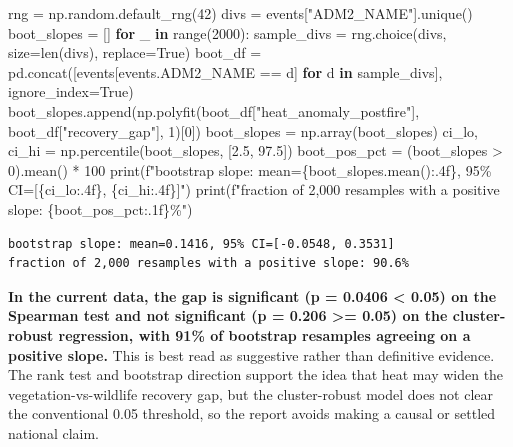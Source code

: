 \documentclass[
  letterpaper,
  DIV=11,
  numbers=noendperiod]{scrartcl}
\newenvironment{Shaded}{\begin{snugshade}}{\end{snugshade}}
\newcommand{\BuiltInTok}[1]{\textcolor[rgb]{0.00,0.23,0.31}{#1}}
\newcommand{\ControlFlowTok}[1]{\textcolor[rgb]{0.00,0.23,0.31}{\textbf{#1}}}
\newcommand{\DecValTok}[1]{\textcolor[rgb]{0.68,0.00,0.00}{#1}}
\newcommand{\FloatTok}[1]{\textcolor[rgb]{0.68,0.00,0.00}{#1}}
\newcommand{\KeywordTok}[1]{\textcolor[rgb]{0.00,0.23,0.31}{\textbf{#1}}}
\newcommand{\NormalTok}[1]{\textcolor[rgb]{0.00,0.23,0.31}{#1}}
\newcommand{\OperatorTok}[1]{\textcolor[rgb]{0.37,0.37,0.37}{#1}}
\newcommand{\SpecialCharTok}[1]{\textcolor[rgb]{0.37,0.37,0.37}{#1}}
\newcommand{\SpecialStringTok}[1]{\textcolor[rgb]{0.13,0.47,0.30}{#1}}
\newcommand{\StringTok}[1]{\textcolor[rgb]{0.13,0.47,0.30}{#1}}
\newcommand{\VariableTok}[1]{\textcolor[rgb]{0.07,0.07,0.07}{#1}}
\begin{document}
\begin{Shaded}
\begin{Highlighting}[]
\NormalTok{rng }\OperatorTok{=}\NormalTok{ np.random.default\_rng(}\DecValTok{42}\NormalTok{)}
\NormalTok{divs }\OperatorTok{=}\NormalTok{ events[}\StringTok{"ADM2\_NAME"}\NormalTok{].unique()}
\NormalTok{boot\_slopes }\OperatorTok{=}\NormalTok{ []}
\ControlFlowTok{for}\NormalTok{ \_ }\KeywordTok{in} \BuiltInTok{range}\NormalTok{(}\DecValTok{2000}\NormalTok{):}
\NormalTok{    sample\_divs }\OperatorTok{=}\NormalTok{ rng.choice(divs, size}\OperatorTok{=}\BuiltInTok{len}\NormalTok{(divs), replace}\OperatorTok{=}\VariableTok{True}\NormalTok{)}
\NormalTok{    boot\_df }\OperatorTok{=}\NormalTok{ pd.concat([events[events.ADM2\_NAME }\OperatorTok{==}\NormalTok{ d] }\ControlFlowTok{for}\NormalTok{ d }\KeywordTok{in}\NormalTok{ sample\_divs], ignore\_index}\OperatorTok{=}\VariableTok{True}\NormalTok{)}
\NormalTok{    boot\_slopes.append(np.polyfit(boot\_df[}\StringTok{"heat\_anomaly\_postfire"}\NormalTok{], boot\_df[}\StringTok{"recovery\_gap"}\NormalTok{], }\DecValTok{1}\NormalTok{)[}\DecValTok{0}\NormalTok{])}
\NormalTok{boot\_slopes }\OperatorTok{=}\NormalTok{ np.array(boot\_slopes)}
\NormalTok{ci\_lo, ci\_hi }\OperatorTok{=}\NormalTok{ np.percentile(boot\_slopes, [}\FloatTok{2.5}\NormalTok{, }\FloatTok{97.5}\NormalTok{])}
\NormalTok{boot\_pos\_pct }\OperatorTok{=}\NormalTok{ (boot\_slopes }\OperatorTok{\textgreater{}} \DecValTok{0}\NormalTok{).mean() }\OperatorTok{*} \DecValTok{100}
\BuiltInTok{print}\NormalTok{(}\SpecialStringTok{f"bootstrap slope: mean=}\SpecialCharTok{\{}\NormalTok{boot\_slopes}\SpecialCharTok{.}\NormalTok{mean()}\SpecialCharTok{:.4f\}}\SpecialStringTok{, 95\% CI=[}\SpecialCharTok{\{}\NormalTok{ci\_lo}\SpecialCharTok{:.4f\}}\SpecialStringTok{, }\SpecialCharTok{\{}\NormalTok{ci\_hi}\SpecialCharTok{:.4f\}}\SpecialStringTok{]"}\NormalTok{)}
\BuiltInTok{print}\NormalTok{(}\SpecialStringTok{f"fraction of 2,000 resamples with a positive slope: }\SpecialCharTok{\{}\NormalTok{boot\_pos\_pct}\SpecialCharTok{:.1f\}}\SpecialStringTok{\%"}\NormalTok{)}
\end{Highlighting}
\end{Shaded}

\begin{verbatim}
bootstrap slope: mean=0.1416, 95% CI=[-0.0548, 0.3531]
fraction of 2,000 resamples with a positive slope: 90.6%
\end{verbatim}

\textbf{In the current data, the gap is significant (p = 0.0406
\textless{} 0.05) on the Spearman test and not significant (p = 0.206
\textgreater= 0.05) on the cluster-robust regression, with 91\% of
bootstrap resamples agreeing on a positive slope.} This is best read as
suggestive rather than definitive evidence. The rank test and bootstrap
direction support the idea that heat may widen the
vegetation-vs-wildlife recovery gap, but the cluster-robust model does
not clear the conventional 0.05 threshold, so the report avoids making a
causal or settled national claim.
\end{document}
